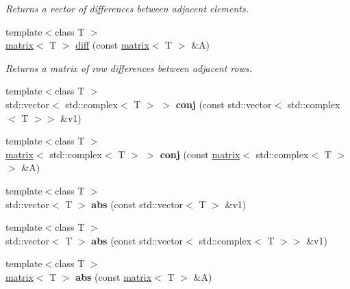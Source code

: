 \begin{DoxyCompactItemize}
\begin{DoxyCompactList}\small\item\em Returns a vector of differences between adjacent elements. \end{DoxyCompactList}\item 
{\footnotesize template$<$class T $>$ }\\\hyperlink{classkeycpp_1_1matrix}{matrix}$<$ T $>$ \hyperlink{namespacekeycpp_abb4e57814fd30b7b8d4845bbc16c73e9}{diff} (const \hyperlink{classkeycpp_1_1matrix}{matrix}$<$ T $>$ \&A)
\begin{DoxyCompactList}\small\item\em Returns a matrix of row differences between adjacent rows. \end{DoxyCompactList}\item 
\hypertarget{namespacekeycpp_a4c2e92e1abe266ccc6735d443c228a97}{{\footnotesize template$<$class T $>$ }\\std\-::vector$<$ std\-::complex$<$ T $>$ $>$ {\bfseries conj} (const std\-::vector$<$ std\-::complex$<$ T $>$$>$ \&v1)}\label{namespacekeycpp_a4c2e92e1abe266ccc6735d443c228a97}

\item 
\hypertarget{namespacekeycpp_a0f000b392fbefccdb089383bb6a20151}{{\footnotesize template$<$class T $>$ }\\\hyperlink{classkeycpp_1_1matrix}{matrix}$<$ std\-::complex$<$ T $>$ $>$ {\bfseries conj} (const \hyperlink{classkeycpp_1_1matrix}{matrix}$<$ std\-::complex$<$ T $>$$>$ \&A)}\label{namespacekeycpp_a0f000b392fbefccdb089383bb6a20151}

\item 
\hypertarget{namespacekeycpp_ab02a8494963dd9566a978221434d9366}{{\footnotesize template$<$class T $>$ }\\std\-::vector$<$ T $>$ {\bfseries abs} (const std\-::vector$<$ T $>$ \&v1)}\label{namespacekeycpp_ab02a8494963dd9566a978221434d9366}

\item 
\hypertarget{namespacekeycpp_acce9304ff511ac2e50ad3016045f22f6}{{\footnotesize template$<$class T $>$ }\\std\-::vector$<$ T $>$ {\bfseries abs} (const std\-::vector$<$ std\-::complex$<$ T $>$$>$ \&v1)}\label{namespacekeycpp_acce9304ff511ac2e50ad3016045f22f6}

\item 
\hypertarget{namespacekeycpp_a1f83b48bfedf753904dfea9dde554a4c}{{\footnotesize template$<$class T $>$ }\\\hyperlink{classkeycpp_1_1matrix}{matrix}$<$ T $>$ {\bfseries abs} (const \hyperlink{classkeycpp_1_1matrix}{matrix}$<$ T $>$ \&A)}\label{namespacekeycpp_a1f83b48bfedf753904dfea9dde554a4c}


\end{DoxyCompactItemize}
